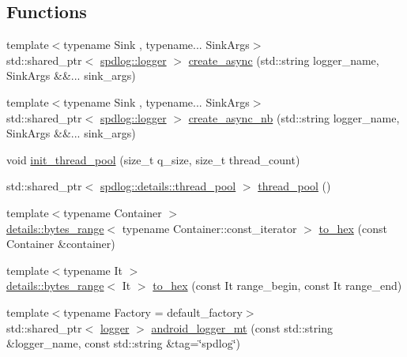 \subsection*{Functions}
\begin{DoxyCompactItemize}
\item 
{\footnotesize template$<$typename Sink , typename... Sink\+Args$>$ }\\std\+::shared\+\_\+ptr$<$ \hyperlink{classspdlog_1_1logger}{spdlog\+::logger} $>$ \hyperlink{namespacespdlog_a220f834b057b45ef730c435bcc60b0aa}{create\+\_\+async} (std\+::string logger\+\_\+name, Sink\+Args \&\&... sink\+\_\+args)
\item 
{\footnotesize template$<$typename Sink , typename... Sink\+Args$>$ }\\std\+::shared\+\_\+ptr$<$ \hyperlink{classspdlog_1_1logger}{spdlog\+::logger} $>$ \hyperlink{namespacespdlog_ac5db26987120ac7b1ba0fbefe551ee52}{create\+\_\+async\+\_\+nb} (std\+::string logger\+\_\+name, Sink\+Args \&\&... sink\+\_\+args)
\item 
void \hyperlink{namespacespdlog_a17a4d95759b4076827905fd8f6b10d36}{init\+\_\+thread\+\_\+pool} (size\+\_\+t q\+\_\+size, size\+\_\+t thread\+\_\+count)
\item 
std\+::shared\+\_\+ptr$<$ \hyperlink{classspdlog_1_1details_1_1thread__pool}{spdlog\+::details\+::thread\+\_\+pool} $>$ \hyperlink{namespacespdlog_a6676a1ffb5ea174a2392ab0317bbcff2}{thread\+\_\+pool} ()
\item 
{\footnotesize template$<$typename Container $>$ }\\\hyperlink{classspdlog_1_1details_1_1bytes__range}{details\+::bytes\+\_\+range}$<$ typename Container\+::const\+\_\+iterator $>$ \hyperlink{namespacespdlog_acd3f4323bb627945b4cecbbbc62770ef}{to\+\_\+hex} (const Container \&container)
\item 
{\footnotesize template$<$typename It $>$ }\\\hyperlink{classspdlog_1_1details_1_1bytes__range}{details\+::bytes\+\_\+range}$<$ It $>$ \hyperlink{namespacespdlog_a3730108d5b1a43b30f8ddf32404b9d25}{to\+\_\+hex} (const It range\+\_\+begin, const It range\+\_\+end)
\item 
{\footnotesize template$<$typename Factory  = default\+\_\+factory$>$ }\\std\+::shared\+\_\+ptr$<$ \hyperlink{classspdlog_1_1logger}{logger} $>$ \hyperlink{namespacespdlog_a0811adb1075181f73abc87c624fbff7e}{android\+\_\+logger\+\_\+mt} (const std\+::string \&logger\+\_\+name, const std\+::string \&tag=\char`\"{}spdlog\char`\"{})

\end{DoxyCompactItemize}
